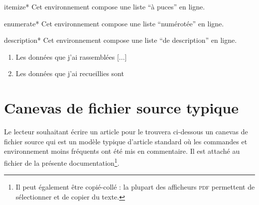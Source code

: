 \begin{docEnvironment}[doclang/environment content=liste]{itemize*}{}
  Cet environnement compose une liste \enquote{à puces} en ligne.
\end{docEnvironment}
\begin{docEnvironment}[doclang/environment content=liste]{enumerate*}{}
  Cet environnement compose une liste \enquote{numérotée} en ligne.
\end{docEnvironment}
\begin{docEnvironment}[doclang/environment content=liste]{description*}{}
  Cet environnement compose une liste \enquote{de description} en ligne.
\end{docEnvironment}

\begin{bodycode}[listing and text,listing options={deletekeywords={url,math,url,pages}}]
\begin{enumerate}
\item Les données que j’ai rassemblées [...]
\item Les données que j’ai recueillies sont
\end{enumerate}
\end{bodycode}

\section{Canevas de fichier source typique}
\label{sec-canevas-de-fichier}

Le lecteur souhaitant écrire un article pour le \nwejm*{} trouvera ci-dessous un
canevas de fichier source qui est un modèle typique d'article standard où les
commandes et environnement moins fréquents ont été mis en commentaire. Il est
attaché au fichier  de la présente documentation\footnote{Il peut
  également être copié-collé : la plupart des afficheurs \textsc{pdf}
  permettent de sélectionner et de copier du texte.}.
%
%
%

\iffalse
\fi
